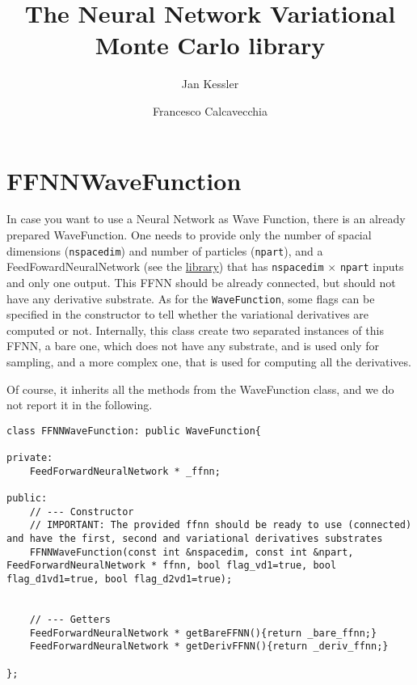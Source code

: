 \documentclass[11pt,a4paper,twoside]{article}
\title{The Neural Network Variational Monte Carlo library}
\author{
  Jan Kessler \and Francesco Calcavecchia
}
\begin{document}
\maketitle


\section{FFNNWaveFunction} %
\label{sec:ffnnwavefunction}

In case you want to use a Neural Network as Wave Function, there is an already prepared WaveFunction.
One needs to provide only the number of spacial dimensions (\verb+nspacedim+) and number of particles (\verb+npart+), and a FeedFowardNeuralNetwork (see the \href{https://github.com/francesco086/FeedForwardNeuralNetwork}{library}) that has \verb+nspacedim+ $\times$ \verb+npart+ inputs and only one output.
This FFNN should be already connected, but should not have any derivative substrate.
As for the \verb+WaveFunction+, some flags can be specified in the constructor to tell whether the variational derivatives are computed or not.
Internally, this class create two separated instances of this FFNN, a bare one, which does not have any substrate, and is used only for sampling, and a more complex one, that is used for computing all the derivatives.

Of course, it inherits all the methods from the WaveFunction class, and we do not report it in the following.

\begin{lstlisting}
class FFNNWaveFunction: public WaveFunction{

private:
    FeedForwardNeuralNetwork * _ffnn;

public:
    // --- Constructor
    // IMPORTANT: The provided ffnn should be ready to use (connected) and have the first, second and variational derivatives substrates
    FFNNWaveFunction(const int &nspacedim, const int &npart, FeedForwardNeuralNetwork * ffnn, bool flag_vd1=true, bool flag_d1vd1=true, bool flag_d2vd1=true);


    // --- Getters
    FeedForwardNeuralNetwork * getBareFFNN(){return _bare_ffnn;}
    FeedForwardNeuralNetwork * getDerivFFNN(){return _deriv_ffnn;}

};
\end{lstlisting}



\end{document}

